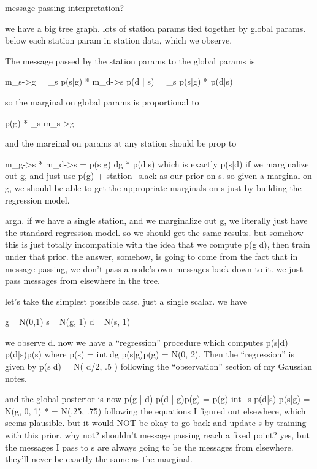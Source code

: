 \documentclass{article}
\begin{document}



message passing interpretation?

we have a big tree graph. lots of station params tied together by global params. below each station param in station data, which we observe. 

The message passed by the station params to the global params is

m_s->g = \int_s p(s|g) * m_d->s p(d | s)
       = \int_s p(s|g) * p(d|s)

so the marginal on global params is proportional to

p(g) * \prod_s m_s->g

and the marginal on params at any station should be prop to

m_g->s * m_d->s
= \int p(s|g) dg * p(d|s)
which is exactly p(s|d) if we marginalize out g, and just use p(g) + station_slack as our prior on s.
so given a marginal on g, we should be able to get the appropriate marginals on s just by building the regression model.



argh. if we have a single station, and we marginalize out g, we literally just have the standard regression model. so we should get the same results. 
but somehow this is just totally incompatible with the idea that we compute p(g|d), then train under that prior.
the answer, somehow, is going to come from the fact that in message passing, we don't pass a node's own messages back down to it. we just pass messages from elsewhere in the tree. 

let's take the simplest possible case. just a single scalar. we have

g ~ N(0,1)
s ~ N(g, 1)
d ~ N(s, 1)

we observe d. now we have a ``regression'' procedure which computes p(s|d) \propto p(d|s)p(s)
where p(s) = int dg p(s|g)p(g) = N(0, 2). Then the ``regression'' is given by
p(s|d) = N( d/2, .5  )
following the ``observation'' section of my Gaussian notes.

and the global posterior is now 
p(g | d) \propto p(d | g)p(g)
               = p(g) int_s p(d|s) p(s|g) 
               = N(g, 0, 1) * 
         = N(.25, .75)
following the equations I figured out elsewhere, which seems plausible. 
but it would NOT be okay to go back and update s by training with this prior. 
why not? shouldn't message passing reach a fixed point? yes, but the messages I pass to s are always going to be the messages from elsewhere. they'll never be exactly the same as the marginal. 
\end{document}
